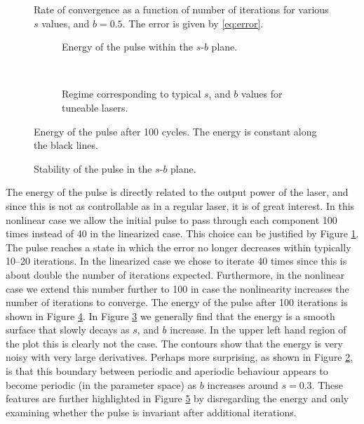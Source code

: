 \begin{figure}[tbp]
\centering

\caption{Rate of convergence as a function of number of iterations for various $s$ values, and $b = 0.5$. The error is given by \eqref{eq:error}.}
\label{fig:roc}
\end{figure}

\begin{figure}[p]
\centering
\begin{subfigure}{\textwidth}

\caption{Energy of the pulse within the $s$-$b$ plane.}
\label{fig:energybig}
\end{subfigure} \\
\begin{subfigure}{\textwidth}

\caption{Regime corresponding to typical $s$, and $b$ values for tuneable lasers.}
\label{fig:energyzoom}
\end{subfigure}
\caption[Energy of the pulse.]{Energy of the pulse after 100 cycles. The energy is constant along the black lines.}
\label{fig:energy}
\end{figure}

\begin{figure}[tbp]

\caption{Stability of the pulse in the $s$-$b$ plane.}
\label{fig:cartoon}
\end{figure}

The energy of the pulse is directly related to the output power of the laser, and since this is not as controllable as in a regular laser, it is of great interest. In this nonlinear case we allow the initial pulse to pass through each component 100 times instead of 40 in the linearized case. This choice can be justified by Figure \ref{fig:roc}. The pulse reaches a state in which the error no longer decreases within typically 10--20 iterations. In the linearized case we chose to iterate 40 times since this is about double the number of iterations expected. Furthermore, in the nonlinear case we extend this number further to 100 in case the nonlinearity increases the number of iterations to converge. The energy of the pulse after 100 iterations is shown in Figure \ref{fig:energy}. In Figure \ref{fig:energyzoom} we generally find that the energy is a smooth surface that slowly decays as $s$, and $b$ increase. In the upper left hand region of the plot this is clearly not the case. The contours show that the energy is very noisy with very large derivatives. Perhaps more surprising, as shown in Figure \ref{fig:energybig}, is that this boundary between periodic and aperiodic behaviour appears to become periodic (in the parameter space) as $b$ increases around $s = 0.3$. These features are further highlighted in Figure \ref{fig:cartoon} by disregarding the energy and only examining whether the pulse is invariant after additional iterations. \\

